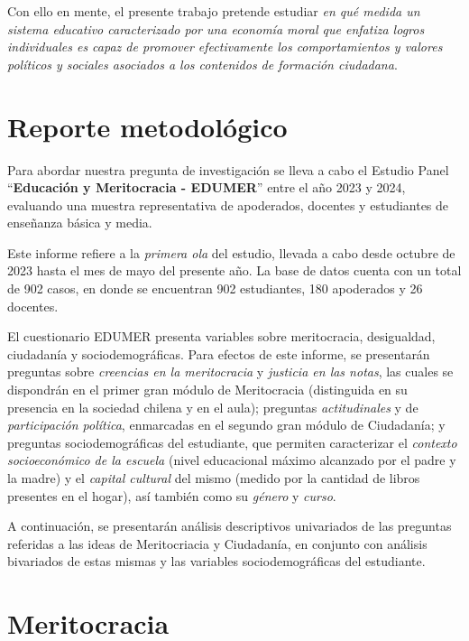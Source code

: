 \documentclass[
  letterpaper,
  DIV=11,
  numbers=noendperiod]{scrreprt}
\begin{document}
Con ello en mente, el presente trabajo pretende estudiar \emph{en qué
medida un sistema educativo caracterizado por una economía moral que
enfatiza logros individuales es capaz de promover efectivamente los
comportamientos y valores políticos y sociales asociados a los
contenidos de formación ciudadana}.


\chapter{Reporte metodológico}\label{reporte-metodoluxf3gico}

Para abordar nuestra pregunta de investigación se lleva a cabo el
Estudio Panel ``\textbf{Educación y Meritocracia - EDUMER}'' entre el
año 2023 y 2024, evaluando una muestra representativa de apoderados,
docentes y estudiantes de enseñanza básica y media.

Este informe refiere a la \emph{primera ola} del estudio, llevada a cabo
desde octubre de 2023 hasta el mes de mayo del presente año. La base de
datos cuenta con un total de 902 casos, en donde se encuentran 902
estudiantes, 180 apoderados y 26 docentes.

El cuestionario EDUMER presenta variables sobre meritocracia,
desigualdad, ciudadanía y sociodemográficas. Para efectos de este
informe, se presentarán preguntas sobre \emph{creencias en la
meritocracia} y \emph{justicia en las notas}, las cuales se dispondrán
en el primer gran módulo de Meritocracia (distinguida en su presencia en
la sociedad chilena y en el aula); preguntas \emph{actitudinales} y de
\emph{participación política}, enmarcadas en el segundo gran módulo de
Ciudadanía; y preguntas sociodemográficas del estudiante, que permiten
caracterizar el \emph{contexto socioeconómico de la escuela} (nivel
educacional máximo alcanzado por el padre y la madre) y el \emph{capital
cultural} del mismo (medido por la cantidad de libros presentes en el
hogar), así también como su \emph{género} y \emph{curso}.

A continuación, se presentarán análisis descriptivos univariados de las
preguntas referidas a las ideas de Meritocriacia y Ciudadanía, en
conjunto con análisis bivariados de estas mismas y las variables
sociodemográficas del estudiante.


\chapter{Meritocracia}\label{meritocracia}
\end{document}
